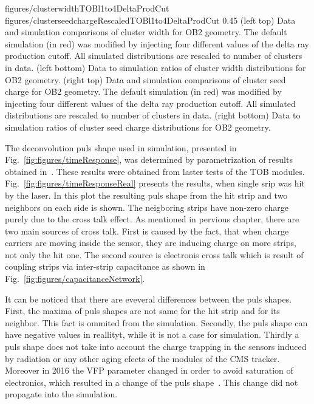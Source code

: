                  {figures/clusterwidthTOBl1to4DeltaProdCut}
                 {figures/clusterseedchargeRescaledTOBl1to4DeltaProdCut} %
                 {0.45}       %
                 {(left top) Data and simulation  comparisons of cluster width for OB2 geometry. The default simulation (in red) was modified by injecting four different values of the delta ray production cutoff. All simulated distributions are rescaled to number of clusters in data. (left bottom) Data to simulation ratios of cluster width distributions for OB2 geometry. (right top) Data and simulation  comparisons of cluster seed charge for OB2 geometry. The default simulation (in red) was modified by injecting four different values of the delta ray production cutoff. All simulated distributions are rescaled to number of clusters in data. (right bottom) Data to simulation ratios of cluster seed charge distributions for OB2 geometry. }


The deconvolution puls shape used in simulation, presented in Fig.~\ref{fig:figures/timeResponse}, was determined by parametrization of results obtained in~\cite{Delaere:1061284}. These results were obtained from laster tests of the TOB modules. Fig.~\ref{fig:figures/timeResponseReal} presents the results, when single srip was hit by the laser. In this plot the resulting puls shape from the hit strip and two neighbors on each side is shown. The neigboring strips have non-zero charge purely due to the cross talk effect. As mentioned in pervious chapter, there are two main sources of cross talk. First is caused by the fact, that when charge carriers are moving inside the sensor, they are inducing charge on more strips, not only the hit one. The second source is electronis cross talk which is result of coupling strips via inter-strip capacitance as shown in Fig.~\ref{fig:figures/capacitanceNetwork}. 


It can be noticed that there are eveveral differences between the puls shapes. First, the maxima of puls shapes are not same for the hit strip and for its neighbor. This fact is ommited from the simulation. Secondly, the puls shape can have negative values in reallityt, while it is not a case for simulation. Thirdly a puls shape does not take into account the charge trapping in the sensors induced by radiation or any other aging efects of the modules of the CMS tracker. Moreover in 2016 the VFP parameter changed in order to avoid saturation of electronics, which resulted in a change of the puls shape~\cite{website:vfp}. This change did not propagate into the simulation.


